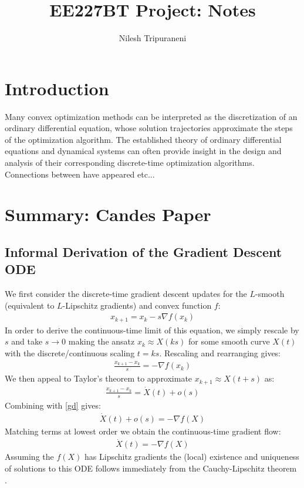 \documentclass{article}
\title{EE227BT Project:
Notes}
\author{Nilesh Tripuraneni}
\begin{document}
\maketitle

\section{Introduction}
Many convex optimization methods can be interpreted as the discretization of an ordinary differential equation, whose solution trajectories approximate the steps of the optimization algorithm. The established theory of ordinary differential equations and dynamical systems can often provide insight in the design and analysis of their corresponding discrete-time optimization algorithms. Connections between have appeared etc... 

\section{Summary: Candes Paper}
\subsection{Informal Derivation of the Gradient Descent ODE}
We first consider the discrete-time gradient descent updates for the $L$-smooth (equivalent to $L$-Lipschitz gradients) and convex function $f$:
\begin{align*}
    x_{k+1} = x_k - s \nabla f(x_k) 
\end{align*}
In order to derive the continuous-time limit of this equation, we simply rescale by $s$ and take $s \to 0$ making the ansatz $x_k \approx X(ks)$ for some smooth curve $X(t)$ with the discrete/continuous scaling $t=ks$. Rescaling and rearranging gives:
\begin{align}
    \frac{x_{k+1} - x_k}{s} = - \nabla f(x_k) \label{gd}
\end{align}
We then appeal to Taylor's theorem to approximate $x_{k+1} \approx X(t+s)$ as:
\begin{align*}
    \frac{x_{k+1} - x_k}{s} = \dot{X}(t) + o(s)
\end{align*}
Combining with \eqref{gd} gives:
\begin{align*}
    \dot{X}(t) + o(s) = - \nabla f(X)
\end{align*}
Matching terms at lowest order we obtain the continuous-time gradient flow:
\begin{align}
    \dot{X}(t) = -\nabla f(X) \label{gdode}
\end{align}
Assuming the $f(X)$ has Lipschitz gradients the (local) existence and uniqueness of solutions to this ODE follows immediately from the Cauchy-Lipschitz theorem \cite{teschl2012ordinary}.
\end{document}
